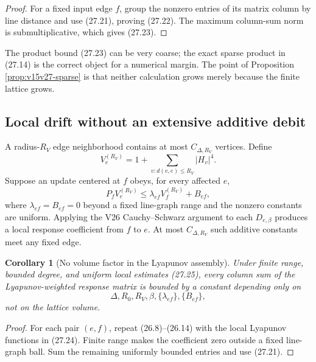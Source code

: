 \documentclass[11pt]{article}
\newtheorem{corollary}[theorem]{Corollary}
\theoremstyle{remark}
\begin{document}
\begin{proof}
For a fixed input edge \(f\), group the nonzero entries of its
matrix column by line distance and use (27.21), proving (27.22).
The maximum column-sum norm is submultiplicative, which gives
(27.23).
\end{proof}

The product bound (27.23) can be very coarse; the exact sparse
product in (27.14) is the correct object for a numerical margin.
The point of Proposition \ref{prop:v15v27-sparse} is that neither
calculation grows merely because the finite lattice grows.

\subsection{Local drift without an extensive additive debit}

A radius-\(R_V\) edge neighborhood contains at most
\(C_{\Delta,R_V}\) vertices.  Define
\[
 V_e^{(R_V)}
 =
 1+\sum_{v:d(v,e)\le R_V}|H_v|^4.                          \tag{27.24}
\]
Suppose an update centered at \(f\) obeys, for every affected
\(e\),
\[
 P_fV_e^{(R_V)}
 \le
 \lambda_{ef}V_f^{(R_V)}+B_{ef},                           \tag{27.25}
\]
where \(\lambda_{ef}=B_{ef}=0\) beyond a fixed line-graph range and
the nonzero constants are uniform.  Applying the V26
Cauchy--Schwarz argument to each \(D_{e,\beta}\) produces a local
response coefficient from \(f\) to \(e\).  At most
\(C_{\Delta,R_V}\) such additive constants meet any fixed edge.

\begin{corollary}[No volume factor in the Lyapunov assembly]
\label{cor:v15v27-no-volume}
Under finite range, bounded degree, and uniform local estimates
(27.25), every column sum of the Lyapunov-weighted response matrix
is bounded by a constant depending only on
\[
 \Delta,R_0,R_V,\beta,\{\lambda_{ef}\},\{B_{ef}\},          \tag{27.26}
\]
not on the lattice volume.
\end{corollary}

\begin{proof}
For each pair \((e,f)\), repeat (26.8)--(26.14) with the local
Lyapunov functions in (27.24).  Finite range makes the coefficient
zero outside a fixed line-graph ball.  Sum the remaining uniformly
bounded entries and use (27.21).
\end{proof}
\end{document}
